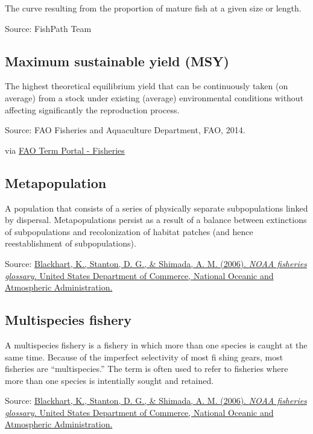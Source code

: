 \documentclass[
  11pt,
]{book}
\begin{document}
The curve resulting from the proportion of mature fish at a given size or length.

Source: FishPath Team

\hypertarget{maximum-sustainable-yield-msy}{%
\subsection{Maximum sustainable yield (MSY)}\label{maximum-sustainable-yield-msy}}

The highest theoretical equilibrium yield that can be continuously taken (on average) from a stock under existing (average) environmental conditions without affecting significantly the reproduction process.

Source: FAO Fisheries and Aquaculture Department, FAO, 2014.

via \href{http://www.fao.org/fishery/glossary/en}{FAO Term Portal - Fisheries}

\hypertarget{metapopulation}{%
\subsection{Metapopulation}\label{metapopulation}}

A population that consists of a series of physically separate subpopulations linked by dispersal.
Metapopulations persist as a result of a balance between
extinctions of subpopulations and recolonization
of habitat patches (and hence reestablishment of
subpopulations).

Source: \href{https://repository.library.noaa.gov/view/noaa/12856}{Blackhart, K., Stanton, D. G., \& Shimada, A. M. (2006). \emph{NOAA fisheries glossary.} United States Department of Commerce, National Oceanic and Atmospheric Administration.}

\hypertarget{multispecies-fishery}{%
\subsection{Multispecies fishery}\label{multispecies-fishery}}

A multispecies fishery is a fishery in which more than one species is caught at the same time. Because of the imperfect selectivity of most fi shing gears, most fisheries are ``multispecies.'' The term is often used to refer to fisheries where more than one species is intentially sought and retained.

Source: \href{https://repository.library.noaa.gov/view/noaa/12856}{Blackhart, K., Stanton, D. G., \& Shimada, A. M. (2006). \emph{NOAA fisheries glossary.} United States Department of Commerce, National Oceanic and Atmospheric Administration.}
\end{document}
